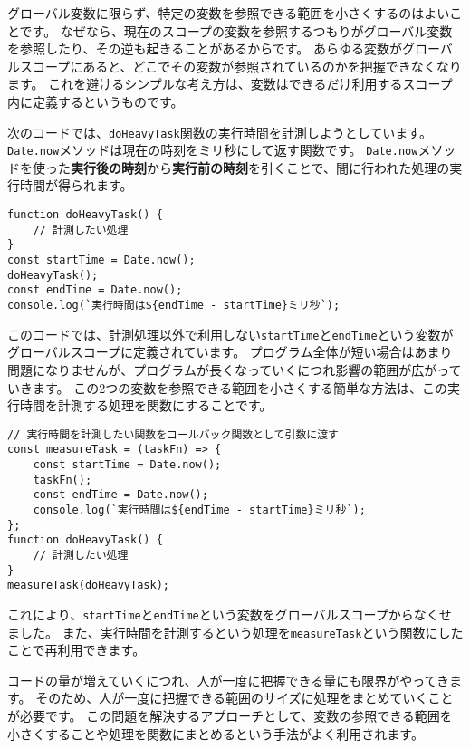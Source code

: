 \begin{tcolorbox}[title=変数を参照できる範囲を小さくする]\label{reduce-scope}

グローバル変数に限らず、特定の変数を参照できる範囲を小さくするのはよいことです。
なぜなら、現在のスコープの変数を参照するつもりがグローバル変数を参照したり、その逆も起きることがあるからです。
あらゆる変数がグローバルスコープにあると、どこでその変数が参照されているのかを把握できなくなります。
これを避けるシンプルな考え方は、変数はできるだけ利用するスコープ内に定義するというものです。

次のコードでは、\texttt{doHeavyTask}関数の実行時間を計測しようとしています。
\texttt{Date.now}メソッドは現在の時刻をミリ秒にして返す関数です。
\texttt{Date.now}メソッドを使った\textbf{実行後の時刻}から\textbf{実行前の時刻}を引くことで、間に行われた処理の実行時間が得られます。

\begin{lstlisting}
function doHeavyTask() {
    // 計測したい処理
}
const startTime = Date.now();
doHeavyTask();
const endTime = Date.now();
console.log(`実行時間は${endTime - startTime}ミリ秒`);
\end{lstlisting}

このコードでは、計測処理以外で利用しない\texttt{startTime}と\texttt{endTime}という変数がグローバルスコープに定義されています。
プログラム全体が短い場合はあまり問題になりませんが、プログラムが長くなっていくにつれ影響の範囲が広がっていきます。
この2つの変数を参照できる範囲を小さくする簡単な方法は、この実行時間を計測する処理を関数にすることです。

\begin{lstlisting}
// 実行時間を計測したい関数をコールバック関数として引数に渡す
const measureTask = (taskFn) => {
    const startTime = Date.now();
    taskFn();
    const endTime = Date.now();
    console.log(`実行時間は${endTime - startTime}ミリ秒`);
};
function doHeavyTask() {
    // 計測したい処理
}
measureTask(doHeavyTask);
\end{lstlisting}

これにより、\texttt{startTime}と\texttt{endTime}という変数をグローバルスコープからなくせました。
また、実行時間を計測するという処理を\texttt{measureTask}という関数にしたことで再利用できます。

コードの量が増えていくにつれ、人が一度に把握できる量にも限界がやってきます。
そのため、人が一度に把握できる範囲のサイズに処理をまとめていくことが必要です。
この問題を解決するアプローチとして、変数の参照できる範囲を小さくすることや処理を関数にまとめるという手法がよく利用されます。
\end{tcolorbox}

